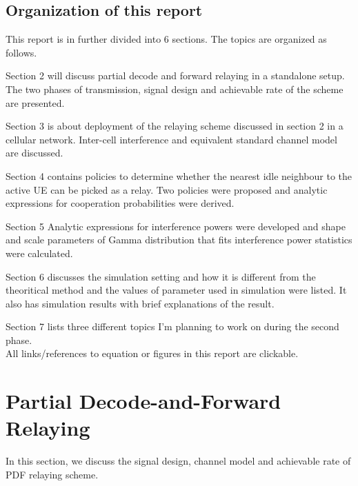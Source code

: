 \subsection{Organization of this report}
This report is in further divided into 6 sections. The topics are organized as follows.
\par Section 2 will discuss partial decode and forward relaying in a standalone setup. The two phases of transmission, signal design and achievable rate of the scheme are presented.
 \par Section 3 is about deployment of the relaying scheme discussed in section 2 in a cellular network. Inter-cell interference and equivalent standard channel model are discussed.
 \par Section 4 contains policies to determine whether the nearest idle neighbour to the active UE can be picked as a relay. Two policies were proposed and analytic expressions for cooperation probabilities were derived.
 \par Section 5 Analytic expressions for interference powers were developed and shape and scale parameters of Gamma distribution that fits interference power statistics were calculated.
 \par Section 6 discusses the simulation setting and how it is different from the theoritical method and the values of parameter used in simulation were listed. It also has simulation results with brief explanations of the result.
 \par Section 7 lists three different topics I'm planning to work on during the second phase. \\
All links/references to equation or figures in this report are clickable.

\newpage
\section{Partial Decode-and-Forward Relaying}
In this section, we discuss the signal design, channel model and achievable rate of PDF relaying scheme.
